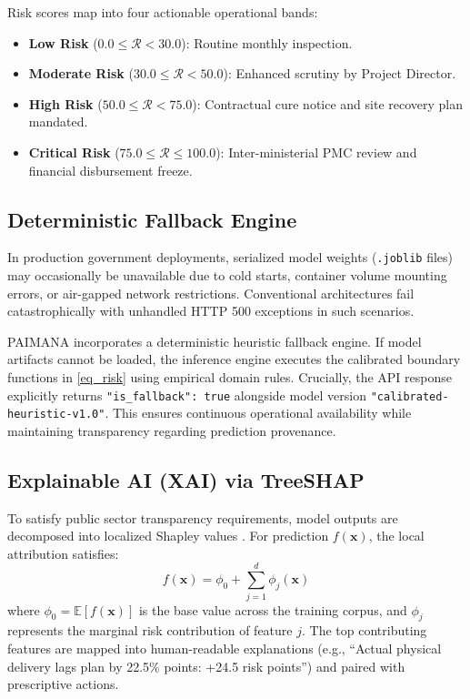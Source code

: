 \documentclass[conference]{IEEEtran}
\begin{document}
Risk scores map into four actionable operational bands:
\begin{itemize}
    \item \textbf{Low Risk} ($0.0 \le \mathcal{R} < 30.0$): Routine monthly inspection.
    \item \textbf{Moderate Risk} ($30.0 \le \mathcal{R} < 50.0$): Enhanced scrutiny by Project Director.
    \item \textbf{High Risk} ($50.0 \le \mathcal{R} < 75.0$): Contractual cure notice and site recovery plan mandated.
    \item \textbf{Critical Risk} ($75.0 \le \mathcal{R} \le 100.0$): Inter-ministerial PMC review and financial disbursement freeze.
\end{itemize}

\subsection{Deterministic Fallback Engine}
In production government deployments, serialized model weights (\texttt{.joblib} files) may occasionally be unavailable due to cold starts, container volume mounting errors, or air-gapped network restrictions. Conventional architectures fail catastrophically with unhandled HTTP 500 exceptions in such scenarios.

PAIMANA incorporates a deterministic heuristic fallback engine. If model artifacts cannot be loaded, the inference engine executes the calibrated boundary functions in \eqref{eq_risk} using empirical domain rules. Crucially, the API response explicitly returns \texttt{"is\_fallback": true} alongside model version \texttt{"calibrated-heuristic-v1.0"}. This ensures continuous operational availability while maintaining transparency regarding prediction provenance.

\subsection{Explainable AI (XAI) via TreeSHAP}
To satisfy public sector transparency requirements, model outputs are decomposed into localized Shapley values \cite{b12}. For prediction $f(\mathbf{x})$, the local attribution satisfies:
\begin{equation}
f(\mathbf{x}) = \phi_0 + \sum_{j=1}^{d} \phi_j(\mathbf{x})
\end{equation}
where $\phi_0 = \mathbb{E}[f(\mathbf{x})]$ is the base value across the training corpus, and $\phi_j$ represents the marginal risk contribution of feature $j$. The top contributing features are mapped into human-readable explanations (e.g., ``Actual physical delivery lags plan by 22.5\% points: +24.5 risk points'') and paired with prescriptive actions.
\end{document}
